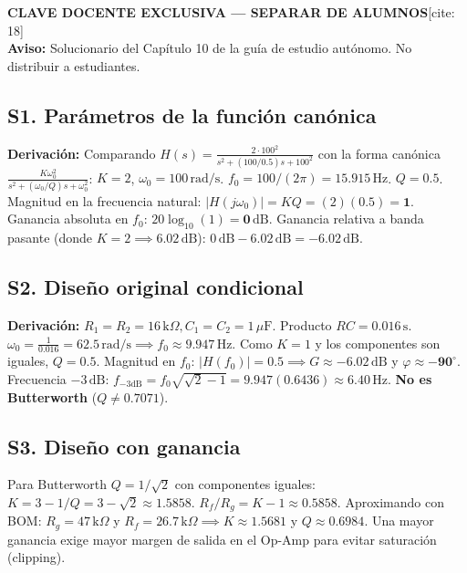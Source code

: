 \documentclass[10pt, a4paper]{article}
\begin{document}
\begin{center}
    {\Large\textbf{\textcolor{red!70!black}{CLAVE DOCENTE EXCLUSIVA — SEPARAR DE ALUMNOS}}}[cite: 18] \\[0.1cm]
    {\footnotesize\textbf{Aviso:} Solucionario del Capítulo 10 de la guía de estudio autónomo. No distribuir a estudiantes.}
\end{center}

\subsection*{S1. Parámetros de la función canónica}
\textbf{Derivación:} Comparando $H(s)=\frac{2\cdot 100^2}{s^2+(100/0.5)s+100^2}$ con la forma canónica $\frac{K\omega_0^2}{s^2+(\omega_0/Q)s+\omega_0^2}$:
$K=2$, $\omega_0=100\,\mathrm{rad/s}$. $f_0 = 100 / (2\pi) = \mathbf{15.915\,\mathrm{Hz}}$. $Q=\mathbf{0.5}$.
Magnitud en la frecuencia natural: $|H(j\omega_0)| = KQ = (2)(0.5) = \mathbf{1}$.
Ganancia absoluta en $f_0$: $20\log_{10}(1) = \mathbf{0\,\mathrm{dB}}$.
Ganancia relativa a banda pasante (donde $K=2 \implies 6.02\,\mathrm{dB}$): $0\,\mathrm{dB} - 6.02\,\mathrm{dB} = \mathbf{-6.02\,\mathrm{dB}}$.

\subsection*{S2. Diseño original condicional}
\textbf{Derivación:} $R_1=R_2=16\,\mathrm{k}\Omega, C_1=C_2=1\,\mu\mathrm{F}$. Producto $RC = 0.016\,\mathrm{s}$.
$\omega_0 = \frac{1}{0.016} = 62.5\,\mathrm{rad/s} \implies f_0 \approx \mathbf{9.947\,\mathrm{Hz}}$.
Como $K=1$ y los componentes son iguales, $Q=\mathbf{0.5}$.
Magnitud en $f_0$: $|H(f_0)| = 0.5 \implies G \approx \mathbf{-6.02\,\mathrm{dB}}$ y $\varphi \approx \mathbf{-90^\circ}$.
Frecuencia $-3\,\mathrm{dB}$: $f_{-3\mathrm{dB}} = f_0 \sqrt{\sqrt{2}-1} = 9.947(0.6436) \approx \mathbf{6.40\,\mathrm{Hz}}$. \textbf{No es Butterworth} ($Q \neq 0.7071$).

\subsection*{S3. Diseño con ganancia}
Para Butterworth $Q=1/\sqrt{2}$ con componentes iguales: $K = 3 - 1/Q = 3 - \sqrt{2} \approx \mathbf{1.5858}$.
$R_f/R_g = K - 1 \approx \mathbf{0.5858}$.
Aproximando con BOM: $R_g=47\,\mathrm{k}\Omega$ y $R_f=26.7\,\mathrm{k}\Omega \implies K \approx 1.5681$ y $Q \approx 0.6984$. Una mayor ganancia exige mayor margen de salida en el Op-Amp para evitar saturación (clipping).
\end{document}
